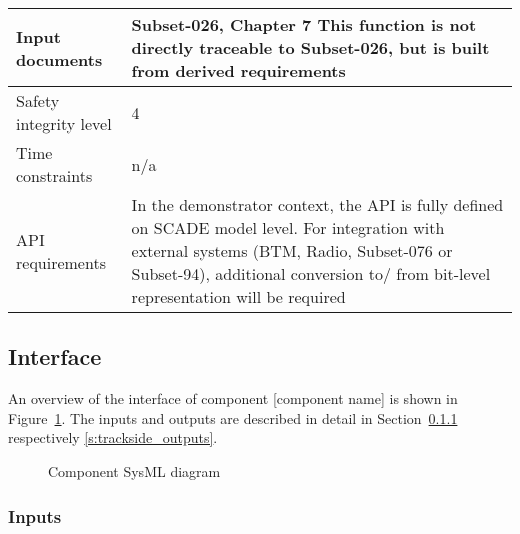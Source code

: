 \begin{longtable}{p{}p{}}
\\

\midrule
Input documents	& 
Subset-026, Chapter 7\newline
\newline
This function is not directly traceable to Subset-026, but is built from derived requirements\\
\midrule
Safety integrity level		& 4 \\
\midrule
Time constraints		& n/a  \\
\midrule
API requirements 		& In the demonstrator context, the API is fully defined on SCADE model level. For integration with external systems (BTM, Radio, Subset-076 or Subset-94), additional conversion to/ from bit-level representation will be required\\
\bottomrule
\end{longtable}


\subsection{Interface}

An overview of the interface of component [component name] is shown in Figure~\ref{f:trackside_interface}. The inputs and outputs are described in detail in Section~\ref{s:trackside_inputs} respectively \ref{s:trackside_outputs}.

\begin{figure}
\center
{}
\caption{Component SysML diagram}\label{f:trackside_interface}
\end{figure}



\subsubsection{Inputs}\label{s:trackside_inputs}

